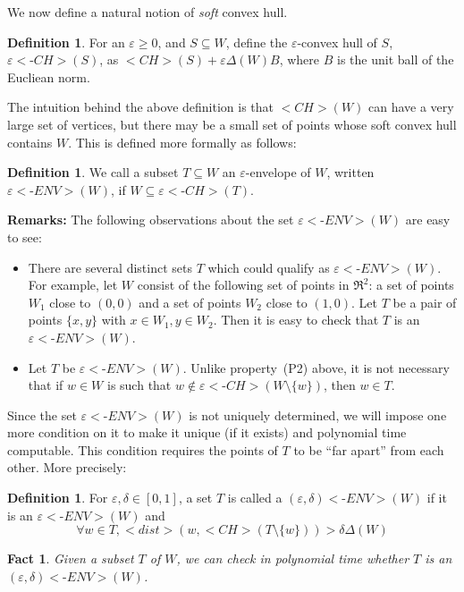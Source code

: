 \documentclass[11pt,letterpaper]{article}
\def\mathsf#1{<#1>}%
\newtheorem{fact}[theorem]{Fact}
\theoremstyle{definition}
\newtheorem{defn}[theorem]{Definition}
\theoremstyle{remark}
\newcommand{\dist}{{\mathsf{dist}}}
\newcommand{\ch}{{\mathsf{CH}}}
\newcommand{\dia}{\Delta}
\newcommand{\eenv}{{\varepsilon{{\mathsf{\mbox{-}ENV}}}}}
\newcommand{\edenv}{{(\varepsilon, \delta){{\mathsf{\mbox{-}ENV}}}}}
\newcommand{\ech}{{\varepsilon{{\mathsf{\mbox{-}CH}}}}}
\begin{document}
We now define a natural notion of {\em soft} convex hull. 
\begin{defn}\label{soft-CH}
For an $\varepsilon \geq 0$, and $S\subseteq W$, define the $\varepsilon$-convex hull of $S$, $\ech(S)$, as $\ch(S) + \varepsilon \dia(W) B$, where $B$ is the unit ball of the Eucliean norm. 
\end{defn}

 The intuition behind the above definition is that $\ch(W)$ can have a very large set of vertices, but there may be a small set of points whose soft convex hull contains $W$. This is defined more formally as follows: 

\begin{defn}\label{envelope}
We call a subset $T\subseteq W$ an $\varepsilon$-envelope of $W$, written
$\eenv(W)$, if 
$W\subseteq \ech(T).$  
\end{defn} 

\noindent
{\bf Remarks:} The following observations about the set $\eenv(W)$ are easy to see:
\begin{itemize}
\item[(a)] There are several distinct sets $T$ which could qualify as $\eenv(W)$. For example, let $W$ consist of the following set of points in $\Re^2$:  a set of points $W_1$ close to $(0,0)$ and a set of points $W_2$ close to $(1,0)$. Let $T$ be a pair of points $\{x,y\}$ with $x \in W_1, y \in W_2$. Then it is easy to check that $T$ is an $\eenv(W)$. 
\item[(b)] Let $T$ be $\eenv(W)$. Unlike property~(P2) above, it is not necessary that if $w \in W$ is such that $w \notin \ech(W \setminus \{w\})$, then $w \in T$. 
 \end{itemize}

Since the set $\eenv(W)$ is not uniquely determined, we will impose one more condition on it to make it unique (if it exists) and polynomial time computable. This condition requires
the points of $T$ to be ``far apart'' from each other. More precisely:

\begin{defn}\label{strict-envelope}
For $\varepsilon,\delta \in [0,1]$, a set $T$ is called a $\edenv(W)$ if it is an $\eenv(W)$ and  
\begin{equation}\label{792}
\forall w\in T, \dist(w,\ch(T\setminus \{w\}))> \delta \dia(W)
\end{equation}
\end{defn}

\begin{fact}
\label{f:check}
Given a subset $T$ of $W$, we can check in polynomial time whether $T$ is an $\edenv(W)$. 
\end{fact}
\end{document}
